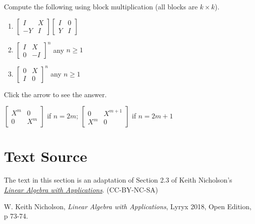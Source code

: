 \documentclass{ximera}
\begin{document}
\begin{problem}\label{prob:blockmatmult_vars}
Compute the following using block multiplication (all blocks are $k \times k$).

\begin{enumerate}
\item
$\left[ \begin{array}{rr}
I & X \\
-Y & I
\end{array} \right] \left[ \begin{array}{rr}
I & 0 \\
Y & I
\end{array} \right]
$

\item %
$\left[ \begin{array}{cc}
I & X \\
0 & -I
\end{array} \right]^{n}
$ any $n \geq 1$

\item %
$\left[ \begin{array}{cc}
0 & X \\
I & 0
\end{array} \right]^{n}
$ any $n \geq 1$
\end{enumerate}

Click the arrow to see the answer.
\begin{expandable}{}{}
$\left[ \begin{array}{cc}
X^{m} & 0 \\
0 & X^{m}
\end{array} \right]$ if $n = 2m$;
$\left[ \begin{array}{cc}
0 & X^{m + 1} \\
X^{m} & 0
\end{array} \right]$ if $n = 2m + 1$
\end{expandable}


\end{problem}

\section*{Text Source}
The text in this section is an adaptation of Section 2.3 of Keith Nicholson's \href{https://open.umn.edu/opentextbooks/textbooks/linear-algebra-with-applications}{\it Linear Algebra with Applications}. (CC-BY-NC-SA)

W. Keith Nicholson, {\it Linear Algebra with Applications}, Lyryx 2018, Open Edition, p 73-74.
\end{document}
